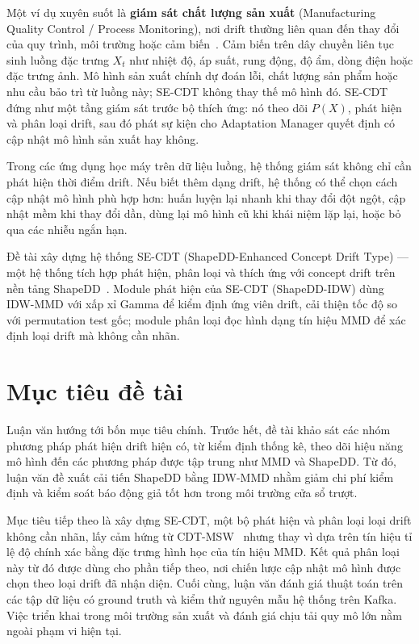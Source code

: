 Một ví dụ xuyên suốt là \textbf{giám sát chất lượng sản xuất} (Manufacturing Quality Control / Process Monitoring), nơi drift thường liên quan đến thay đổi của quy trình, môi trường hoặc cảm biến~\cite{jourdan2023process,hinder2024survey_partA}. Cảm biến trên dây chuyền liên tục sinh luồng đặc trưng $X_t$ như nhiệt độ, áp suất, rung động, độ ẩm, dòng điện hoặc đặc trưng ảnh. Mô hình sản xuất chính dự đoán lỗi, chất lượng sản phẩm hoặc nhu cầu bảo trì từ luồng này; SE-CDT không thay thế mô hình đó. SE-CDT đứng như một tầng giám sát trước bộ thích ứng: nó theo dõi $P(X)$, phát hiện và phân loại drift, sau đó phát sự kiện cho Adaptation Manager quyết định có cập nhật mô hình sản xuất hay không.

Trong các ứng dụng học máy trên dữ liệu luồng, hệ thống giám sát không chỉ cần phát hiện thời điểm drift. Nếu biết thêm dạng drift, hệ thống có thể chọn cách cập nhật mô hình phù hợp hơn: huấn luyện lại nhanh khi thay đổi đột ngột, cập nhật mềm khi thay đổi dần, dùng lại mô hình cũ khi khái niệm lặp lại, hoặc bỏ qua các nhiễu ngắn hạn.

Đề tài xây dựng hệ thống SE-CDT (ShapeDD-Enhanced Concept Drift Type) --- một hệ thống tích hợp phát hiện, phân loại và thích ứng với concept drift trên nền tảng ShapeDD~\cite{shapeDD2021}. Module phát hiện của SE-CDT (ShapeDD-IDW) dùng IDW-MMD với xấp xỉ Gamma để kiểm định ứng viên drift, cải thiện tốc độ so với permutation test gốc; module phân loại đọc hình dạng tín hiệu MMD để xác định loại drift mà không cần nhãn.

\section{Mục tiêu đề tài}

Luận văn hướng tới bốn mục tiêu chính. Trước hết, đề tài khảo sát các nhóm phương pháp phát hiện drift hiện có, từ kiểm định thống kê, theo dõi hiệu năng mô hình đến các phương pháp được tập trung như MMD và ShapeDD. Từ đó, luận văn đề xuất cải tiến ShapeDD bằng IDW-MMD nhằm giảm chi phí kiểm định và kiểm soát báo động giả tốt hơn trong môi trường cửa sổ trượt.

Mục tiêu tiếp theo là xây dựng SE-CDT, một bộ phát hiện và phân loại loại drift không cần nhãn, lấy cảm hứng từ CDT-MSW~\cite{guo2022cdtmsw} nhưng thay vì dựa trên tín hiệu tỉ lệ độ chính xác bằng đặc trưng hình học của tín hiệu MMD. Kết quả phân loại này từ đó được dùng cho phần tiếp theo, nơi chiến lược cập nhật mô hình được chọn theo loại drift đã nhận diện. Cuối cùng, luận văn đánh giá thuật toán trên các tập dữ liệu có ground truth và kiểm thử nguyên mẫu hệ thống trên Kafka. Việc triển khai trong môi trường sản xuất và đánh giá chịu tải quy mô lớn nằm ngoài phạm vi hiện tại.


